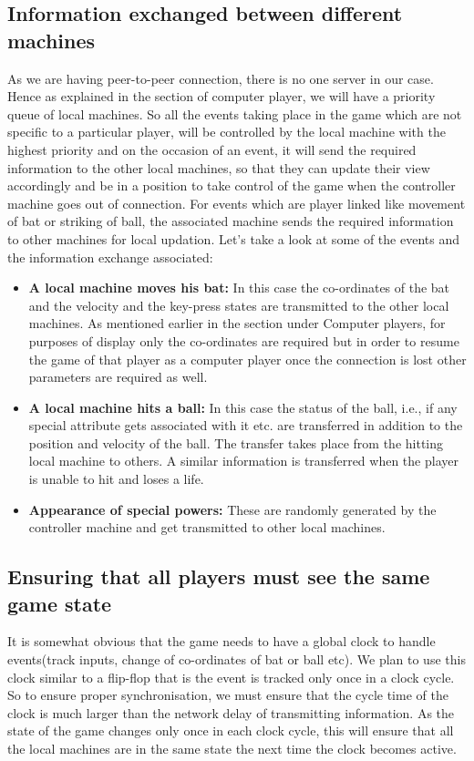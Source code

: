 \documentclass{article}
\begin{document}
\subsection{Information exchanged between different machines}
As we are having peer-to-peer connection, there is no one server in our case. Hence as explained in the section of computer player, we will have a priority queue of local machines. So all the events taking place in the game which are not specific to a particular player, will be controlled by the local machine with the highest priority and on the occasion of an event, it will send the required information to the other local machines, so that they can update their view accordingly and be in a position to take control of the game when the controller machine goes out of connection. For events which are player linked like movement of bat or striking of ball, the associated machine sends the required information to other machines for local updation. Let's take a look at some of the events and the information exchange associated:
\begin{itemize}
    \item \textbf{A local machine moves his bat:} In this case the co-ordinates of the bat and the velocity and the key-press states are transmitted to the other local machines. As mentioned earlier in the section under Computer players, for purposes of display only the co-ordinates are required but in order to resume the game of that player as a computer player once the connection is lost other parameters are required as well.
    \item \textbf{A local machine hits a ball:} In this case the status of the ball, i.e., if any special attribute gets associated with it etc. are transferred in addition to the position and velocity of the ball. The transfer takes place from the hitting local machine to others. A similar information is transferred when the player is unable to hit and loses a life.
    \item \textbf{Appearance of special powers:} These are randomly generated by the controller machine and get transmitted to other local machines.
\end{itemize}
\subsection{Ensuring that all players must see the same game state}
It is somewhat obvious that the game needs to have a global clock to handle events(track inputs, change of co-ordinates of bat or ball etc). We plan to use this clock similar to a flip-flop that is the event is tracked only once in a clock cycle. So to ensure proper synchronisation, we must ensure that the cycle time of the clock is much larger than the network delay of transmitting information. As the state of the game changes only once in each clock cycle, this will ensure that all the local machines are in the same state the next time the clock becomes active.
\end{document}
